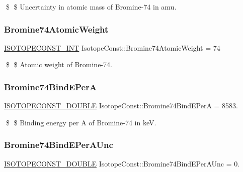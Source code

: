 \$ \$ Uncertainty in atomic mass of Bromine-\/74 in amu. \mbox{\label{group___isotope_const-_bromine-_br74_ga33c5dca754995a2ec6daf427fc24259e}} 
\subsubsection{\texorpdfstring{Bromine74\+Atomic\+Weight}{Bromine74AtomicWeight}}
{\footnotesize\ttfamily \mbox{\hyperlink{group___isotope_const-_macros_ga5f18360b3e99483a35c32d789e62621c}{I\+S\+O\+T\+O\+P\+E\+C\+O\+N\+S\+T\+\_\+\+I\+NT}} Isotope\+Const\+::\+Bromine74\+Atomic\+Weight = 74}

\$ \$ Atomic weight of Bromine-\/74. \mbox{\label{group___isotope_const-_bromine-_br74_gaead118d0599c6cf20dfb1e05797cea2e}} 
\subsubsection{\texorpdfstring{Bromine74\+Bind\+E\+PerA}{Bromine74BindEPerA}}
{\footnotesize\ttfamily \mbox{\hyperlink{group___isotope_const-_macros_ga8f45a7272ce02c0b4c65c44636ed719a}{I\+S\+O\+T\+O\+P\+E\+C\+O\+N\+S\+T\+\_\+\+D\+O\+U\+B\+LE}} Isotope\+Const\+::\+Bromine74\+Bind\+E\+PerA = 8583.}

\$ \$ Binding energy per A of Bromine-\/74 in keV. \mbox{\label{group___isotope_const-_bromine-_br74_ga0934fa5200443f06c4e8b0cd6df3509e}} 
\subsubsection{\texorpdfstring{Bromine74\+Bind\+E\+Per\+A\+Unc}{Bromine74BindEPerAUnc}}
{\footnotesize\ttfamily \mbox{\hyperlink{group___isotope_const-_macros_ga8f45a7272ce02c0b4c65c44636ed719a}{I\+S\+O\+T\+O\+P\+E\+C\+O\+N\+S\+T\+\_\+\+D\+O\+U\+B\+LE}} Isotope\+Const\+::\+Bromine74\+Bind\+E\+Per\+A\+Unc = 0.}

